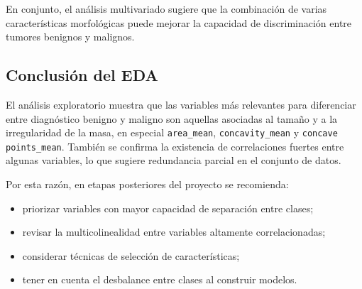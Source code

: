 \documentclass[12pt]{article}
\begin{document}
En conjunto, el análisis multivariado sugiere que la combinación de varias características morfológicas puede mejorar la capacidad de discriminación entre tumores benignos y malignos.

\subsection{Conclusión del EDA}

El análisis exploratorio muestra que las variables más relevantes para diferenciar entre diagnóstico benigno y maligno son aquellas asociadas al tamaño y a la irregularidad de la masa, en especial \texttt{area\_mean}, \texttt{concavity\_mean} y \texttt{concave points\_mean}.  
También se confirma la existencia de correlaciones fuertes entre algunas variables, lo que sugiere redundancia parcial en el conjunto de datos.

Por esta razón, en etapas posteriores del proyecto se recomienda:
\begin{itemize}
    \item priorizar variables con mayor capacidad de separación entre clases;
    \item revisar la multicolinealidad entre variables altamente correlacionadas;
    \item considerar técnicas de selección de características;
    \item tener en cuenta el desbalance entre clases al construir modelos.
\end{itemize}
\end{document}
